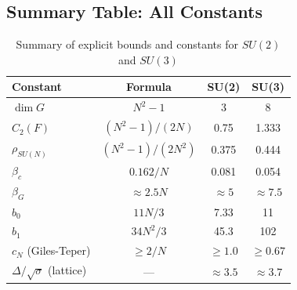 \subsection{Summary Table: All Constants}

\begin{table}[ht]
\centering
\caption{Summary of explicit bounds and constants for $SU(2)$ and $SU(3)$}
\begin{tabular}{|l|c|c|c|}
\hline
\textbf{Constant} & \textbf{Formula} & \textbf{SU(2)} & \textbf{SU(3)} \\
\hline
$\dim G$ & $N^2-1$ & 3 & 8 \\
$C_2(F)$ & $(N^2-1)/(2N)$ & 0.75 & 1.333 \\
$\rho_{SU(N)}$ & $(N^2-1)/(2N^2)$ & 0.375 & 0.444 \\
$\beta_c$ & $0.162/N$ & 0.081 & 0.054 \\
$\beta_G$ & $\approx 2.5N$ & $\approx 5$ & $\approx 7.5$ \\
$b_0$ & $11N/3$ & 7.33 & 11 \\
$b_1$ & $34N^2/3$ & 45.3 & 102 \\
$c_N$ (Giles-Teper) & $\geq 2/N$ & $\geq 1.0$ & $\geq 0.67$ \\
$\Delta/\sqrt{\sigma}$ (lattice) & --- & $\approx 3.5$ & $\approx 3.7$ \\
\hline
\end{tabular}
\end{table}






